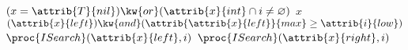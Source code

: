 \begin{codebox}
\li \If $(x = \attrib{T}{nil}) \kw{ or } (\attrib{x}{int} \cap i \neq \varnothing)$
\li \Then 
        \Return $x$
\li \Else \If $(\attrib{x}{left}) \kw{ and } (\attrib{\attrib{x}{left}}{max} \geq \attrib{i}{low})$
\li     \Return $\proc{ISearch}(\attrib{x}{left}, i)$
\li \Else 
\li     \Return $\proc{ISearch}(\attrib{x}{right}, i)$
    \End
\end{codebox}